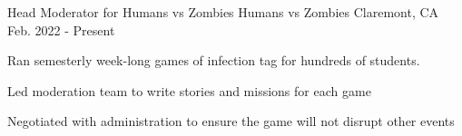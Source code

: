 

\begin{cventries}

  \cventry
    {Head Moderator for Humans vs Zombies} %
    {Humans vs Zombies} %
    {Claremont, CA} %
    {Feb. 2022 - Present} %
    {
    \begin{cvitems}
      \item{
      Ran semesterly week-long games of infection tag for hundreds of students.
      \item{
      Led moderation team to write stories and missions for each game
      }
      \item{
      Negotiated with administration to ensure the game will not disrupt other events
      }
      }
    \end{cvitems}
    }

\end{cventries}
